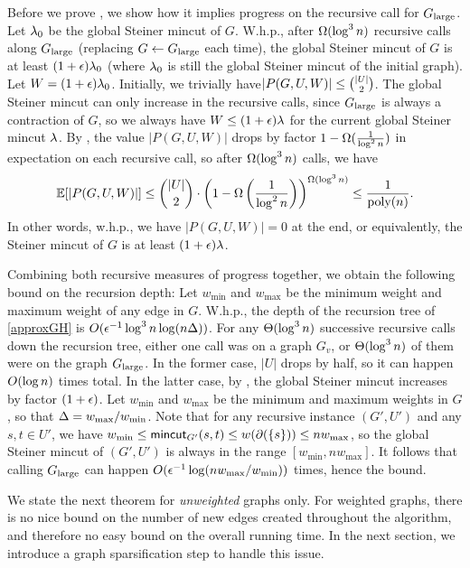 Before we prove , we show how it implies progress on the recursive call for $G_{\textup{large}}$.
\BC{}
Let $\lambda_0$ be the global Steiner mincut of $G$.
W.h.p., after $\Omega(\log^3n)$ recursive calls along $G_{\textup{large}}$ (replacing $G\gets G_{\textup{large}}$ each time), the global Steiner mincut of $G$ is at least $(1+\epsilon)\lambda_0$ (where $\lambda_0$ is still the global Steiner mincut of the initial graph).
\EC
\BP
Let $W=(1+\epsilon)\lambda_0$.
Initially, we trivially have\linebreak $|P(G,U,W)|\le\binom{|U|}2$. The global Steiner mincut can only increase in the recursive calls, since $G_{\textup{large}}$ is always a contraction of $G$, so we always have $W\le(1+\epsilon)\lambda$ for the current global Steiner mincut $\lambda$. By , the value $|P(G,U,W)|$ drops by factor $1-\Omega(\frac1{\log^2n})$ in expectation on each recursive call, so after $\Omega(\log^3n)$ calls, we have
\[ \mathbb E[|P(G,U,W)|]\le\binom{|U|}2\cdot\left(1-\Omega\left(\frac1{\log^2n}\right)\right)^{\Omega(\log^3n)}\le\frac1{\textup{poly}(n)} .\]
In other words, w.h.p., we have $|P(G,U,W)|=0$ at the end, or equivalently, the Steiner mincut of $G$ is at least $(1+\epsilon)\lambda$.
\EP

Combining both recursive measures of progress together, we obtain the following bound on the recursion depth:
\BL{}
Let $w_{\min}$ and $w_{\max}$ be the minimum weight and maximum weight of any edge in $G$.
W.h.p., the depth of the recursion tree of \ref{approxGH} is $O(\epsilon^{-1}\log^3n\log(n\Delta))$.
\EL
\BP
For any $\Theta(\log^3n)$ successive recursive calls down the recursion tree, either one call was on a graph $G_v$, or $\Theta(\log^3n)$ of them were on the graph $G_{\textup{large}}$. In the former case, $|U|$ drops by half, so it can happen $O(\log n)$ times total. In the latter case, by , the global Steiner mincut increases by factor $(1+\epsilon)$. Let $w_{\min}$ and $w_{\max}$ be the minimum and maximum weights in $G$, so that $\Delta=w_{\max}/w_{\min}$. Note that for any recursive instance $(G',U')$ and any $s,t\in U'$, we have $w_{\min}\le\textsf{\textup{mincut}}_{G'}(s,t)\le w(\partial(\{s\}))\le nw_{\max}$, so the global Steiner mincut of $(G',U')$ is always in the range $[w_{\min},nw_{\max}]$. It follows that calling $G_{\textup{large}}$ can happen $O(\epsilon^{-1}\log(nw_{\max}/w_{\min}))$ times, hence the bound.
\EP

We state the next theorem for \emph{unweighted} graphs only. For weighted graphs, there is no nice bound on the number of new edges created throughout the algorithm, and therefore no easy bound on the overall running time. In the next section, we introduce a graph sparsification step to handle this issue.

